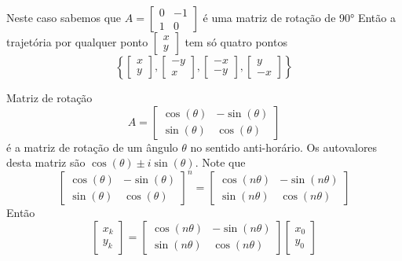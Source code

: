 \documentclass{beamer}
\begin{document}
\begin{frame}
  Neste caso sabemos que $A=\begin{bmatrix}
    0 & -1 \\ 1 & 0
  \end{bmatrix}$ é uma matriz de rotação de \ang{90}
  Então a trajetória por qualquer ponto $\begin{bmatrix}
    x \\ y
  \end{bmatrix}$ tem só quatro pontos
  $$\left\{  \begin{bmatrix}
    x \\ y
  \end{bmatrix}, \begin{bmatrix}
    -y \\ x
  \end{bmatrix}, \begin{bmatrix}
    -x \\ -y 
  \end{bmatrix} , \begin{bmatrix}
    y \\ -x
  \end{bmatrix}\right\}$$
\end{frame}

\begin{frame}{Matriz de rotação}
  $$ A= \begin{bmatrix}
    \cos(\theta) & -\sin(\theta) \\
    \sin(\theta)& \cos(\theta)
  \end{bmatrix}$$ é a matriz de rotação de um ângulo
  $\theta$ no sentido anti-horário. Os autovalores desta
  matriz são $\cos(\theta) \pm i\sin(\theta)$.
  Note que
  $$ \begin{bmatrix}
    \cos(\theta) & -\sin(\theta) \\
    \sin(\theta)& \cos(\theta)
  \end{bmatrix}^n=\begin{bmatrix}
    \cos(n\theta) & -\sin(n\theta) \\
    \sin(n\theta)& \cos(n\theta)
  \end{bmatrix} $$
  Então 
  $$ \begin{bmatrix}
    x_k \\ y_k
  \end{bmatrix} = \begin{bmatrix}
    \cos(n\theta) & -\sin(n\theta) \\
    \sin(n\theta)& \cos(n\theta)
  \end{bmatrix}\begin{bmatrix}
    x_0 \\ y_0
  \end{bmatrix} $$
      
\end{frame}
\end{document}
